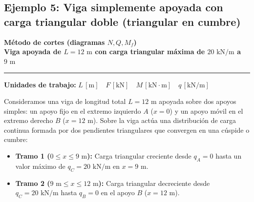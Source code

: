 \subsection{Ejemplo 5: Viga simplemente apoyada con carga triangular doble (triangular en cumbre)}



\begin{tcolorbox}[colback=blue!3!white, colframe=blue!40!black, arc=3pt, boxrule=0.8pt, left=8pt, right=8pt, top=6pt, bottom=6pt]

    \centering

    {\Large\bfseries\color{blue!60!black} Método de cortes (diagramas $N, Q, M_f$)}\\[2pt]

    {\normalsize\bfseries Viga apoyada de $L = 12\text{ m}$ con carga triangular máxima de $20\text{ kN/m}$ a $9\text{ m}$}



    \vspace{4pt}\hrule\vspace{4pt}

    {\small\textbf{Unidades de trabajo:} $L\,[\text{m}] \quad F\,[\text{kN}] \quad M\,[\text{kN}\cdot\text{m}] \quad q\,[\text{kN/m}]$}

\end{tcolorbox}






Consideramos una viga de longitud total $L = 12\text{ m}$ apoyada sobre dos apoyos simples: un apoyo fijo en el extremo izquierdo $A$ ($x = 0$) y un apoyo móvil en el extremo derecho $B$ ($x = 12\text{ m}$). Sobre la viga actúa una distribución de carga continua formada por dos pendientes triangulares que convergen en una cúspide o cumbre:

\begin{itemize}

    \item \textbf{Tramo 1 ($0 \le x \le 9\text{ m}$):} Carga triangular creciente desde $q_A = 0$ hasta un valor máximo de $q_C = 20\text{ kN/m}$ en $x = 9\text{ m}$.

    \item \textbf{Tramo 2 ($9\text{ m} \le x \le 12\text{ m}$):} Carga triangular decreciente desde $q_C = 20\text{ kN/m}$ hasta $q_B = 0$ en el apoyo $B$ ($x = 12\text{ m}$).

\end{itemize}



